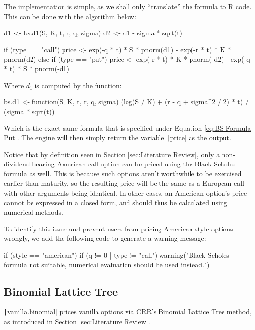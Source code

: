 The implementation is simple, as we shall only ``translate'' the formula to R code. This can be done with the algorithm below:

\begin{Rminted}
d1 <- bs.d1(S, K, t, r, q, sigma)
d2 <- d1 - sigma * sqrt(t)

if (type == "call") {
    price <- exp(-q * t) * S * pnorm(d1) - exp(-r * t) * K * pnorm(d2)
} else if (type == "put") {
    price <- exp(-r * t) * K * pnorm(-d2) - exp(-q * t) * S * pnorm(-d1)
}
\end{Rminted}

Where $d_1$ is computed by the function:

\begin{Rminted}
bs.d1 <- function(S, K, t, r, q, sigma) {
    (log(S / K) + (r - q + sigma^2 / 2) * t) / (sigma * sqrt(t))
}
\end{Rminted}

Which is the exact same formula that is specified under Equation \ref{eq:BS Formula Put}. The engine will then simply return the variable \texttt|price| as the output.

Notice that by definition seen in Section \ref{sec:Literature Review}, only a non-dividend bearing American call option can be priced using the Black-Scholes formula as well. This is because such options aren't worthwhile to be exercised earlier than maturity, so the resulting price will be the same as a European call with other arguments being identical. In other cases, an American option's price cannot be expressed in a closed form, and should thus be calculated using numerical methods.

To identify this issue and prevent users from pricing American-style options wrongly, we add the following code to generate a warning message:

\begin{Rminted}
if (style == "american") {
    if (q != 0 | type != "call") {
        warning("Black-Scholes formula not suitable, numerical evaluation should be used instead.")
    }
}
\end{Rminted}

\subsection{Binomial Lattice Tree}

\texttt|vanilla.binomial| prices vanilla options via CRR's Binomial Lattice Tree method, as introduced in Section \ref{sec:Literature Review}.


